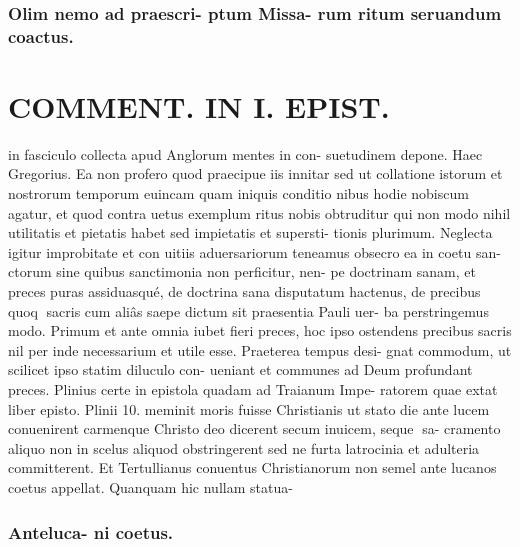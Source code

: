 \documentclass{article}
\begin{document}
\begin{pages}
\subsubsection*{Olim nemo ad praescri- ptum Missa- rum ritum seruandum coactus. }
\section*{COMMENT. IN I. EPIST. }\pstart in fasciculo collecta apud Anglorum mentes in con- suetudinem depone. Haec Gregorius. Ea non profero quod praecipue iis innitar sed ut collatione istorum et nostrorum temporum euincam quam iniquis conditio nibus hodie nobiscum agatur, et quod contra uetus exemplum ritus nobis obtruditur qui non modo nihil utilitatis et pietatis habet sed impietatis et supersti- tionis plurimum. Neglecta igitur improbitate et con uitiis aduersariorum teneamus obsecro ea in coetu san- ctorum sine quibus sanctimonia non perficitur, nen- pe doctrinam sanam, et preces puras assiduasqué, de doctrina sana disputatum hactenus, de precibus quoq sacris cum aliâs saepe dictum sit praesentia Pauli uer- ba perstringemus modo. Primum et ante omnia iubet fieri preces, hoc ipso ostendens precibus sacris nil per inde necessarium et utile esse. Praeterea tempus desi- gnat commodum, ut scilicet ipso statim diluculo con- ueniant et communes ad Deum profundant preces. Plinius certe in epistola quadam ad Traianum Impe- ratorem quae extat liber  episto. Plinii 10. meminit moris fuisse Christianis ut stato die ante lucem conuenirent carmenque Christo deo dicerent secum inuicem, seque sa- cramento aliquo non in scelus aliquod obstringerent sed ne furta latrocinia et adulteria committerent. Et Tertullianus conuentus Christianorum non semel ante lucanos coetus appellat. Quanquam hic nullam statua-  \pend
\subsubsection*{Anteluca- ni coetus. }

\end{pages}
\end{document}
